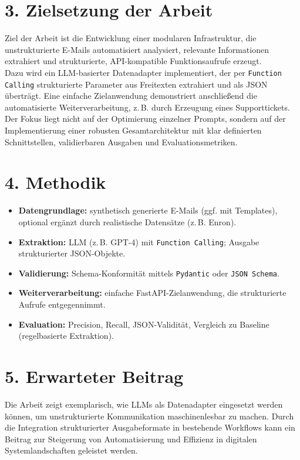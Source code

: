 \documentclass[12pt,a4paper]{scrartcl}
\begin{document}
\section*{3. Zielsetzung der Arbeit}

Ziel der Arbeit ist die Entwicklung einer modularen Infrastruktur, die unstrukturierte E-Mails automatisiert analysiert, relevante Informationen extrahiert und strukturierte, API-kompatible Funktionsaufrufe erzeugt.\\

Dazu wird ein LLM-basierter Datenadapter implementiert, der per \texttt{Function Calling} strukturierte Parameter aus Freitexten extrahiert und als JSON überträgt. Eine einfache Zielanwendung demonstriert anschließend die automatisierte Weiterverarbeitung, z.\,B. durch Erzeugung eines Supporttickets.\\

Der Fokus liegt nicht auf der Optimierung einzelner Prompts, sondern auf der Implementierung einer robusten Gesamtarchitektur mit klar definierten Schnittstellen, validierbaren Ausgaben und Evaluationsmetriken.

\section*{4. Methodik}

\begin{itemize}
  \item \textbf{Datengrundlage:} synthetisch generierte E-Mails (ggf. mit Templates), optional ergänzt durch realistische Datensätze (z.\,B. Enron).
  \item \textbf{Extraktion:} LLM (z.\,B. GPT-4) mit \texttt{Function Calling}; Ausgabe strukturierter JSON-Objekte.
  \item \textbf{Validierung:} Schema-Konformität mittels \texttt{Pydantic} oder \texttt{JSON Schema}.
  \item \textbf{Weiterverarbeitung:} einfache FastAPI-Zielanwendung, die strukturierte Aufrufe entgegennimmt.
  \item \textbf{Evaluation:} Precision, Recall, JSON-Validität, Vergleich zu Baseline (regelbasierte Extraktion).
\end{itemize}

\section*{5. Erwarteter Beitrag}

Die Arbeit zeigt exemplarisch, wie LLMs als Datenadapter eingesetzt werden können, um unstrukturierte Kommunikation maschinenlesbar zu machen. Durch die Integration strukturierter Ausgabeformate in bestehende Workflows kann ein Beitrag zur Steigerung von Automatisierung und Effizienz in digitalen Systemlandschaften geleistet werden.
\end{document}
